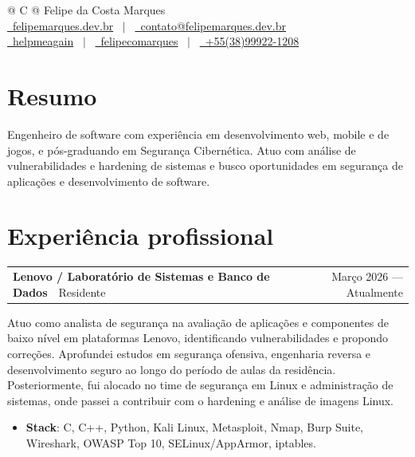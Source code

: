 \documentclass[a4paper,12pt]{article}
\makeatletter
\newenvironment{jobshort}[3]
    {
    \begin{tabularx}{\linewidth}{@{}l X r@{}}
    \textbf{#1}\ \ {\footnotesize\if\relax\detokenize{#3}\relax\else #3\fi} & \hfill & #2 \\
    \end{tabularx}
    }
    {
    }
\makeatother
\begin{document}
\pagestyle{empty} 


\begin{tabularx}{\linewidth}{@{} C @{}}
\Huge{Felipe da Costa Marques} \\[7.5pt]

\href{https://felipemarques.dev.br/}{\raisebox{-0.05\height}\faGlobe\ felipemarques.dev.br}
\ $|$ \
\href{mailto:contato@felipemarques.dev.br}{\raisebox{-0.05\height}\faEnvelope\ contato@felipemarques.dev.br} \\

\href{https://github.com/helpmeagain}{\raisebox{-0.05\height}\faGithub\ helpmeagain}
\ $|$ \
\href{https://www.linkedin.com/in/felipecomarques/}{\raisebox{-0.05\height}\faLinkedin\ felipecomarques}
\ $|$ \
\href{tel:+5538999221208}{\raisebox{-0.05\height}\faMobile \ +55(38)99922-1208} \\

\end{tabularx}


\section{Resumo}
Engenheiro de software com experiência em desenvolvimento web, mobile e de jogos, e pós-graduando em Segurança Cibernética. Atuo com análise de vulnerabilidades e hardening de sistemas e busco oportunidades em segurança de aplicações e desenvolvimento de software.

\section{Experiência profissional}

\begin{jobshort}{Lenovo / Laboratório de Sistemas e Banco de Dados}{Março 2026 — Atualmente}{Residente}
Atuo como analista de segurança na avaliação de aplicações e componentes de baixo nível em plataformas Lenovo, identificando vulnerabilidades e propondo correções. Aprofundei estudos em segurança ofensiva, engenharia reversa e desenvolvimento seguro ao longo do período de aulas da residência. Posteriormente, fui alocado no time de segurança em Linux e administração de sistemas, onde passei a contribuir com o hardening e análise de imagens Linux.
\begin{itemize}[nosep,after=\strut, leftmargin=0em, itemsep=3pt,label={}]
    \item \textbf{Stack}: C, C++, Python, Kali Linux, Metasploit, Nmap, Burp Suite, Wireshark, OWASP Top 10, SELinux/AppArmor, iptables.
\end{itemize}
\end{jobshort}
\end{document}
